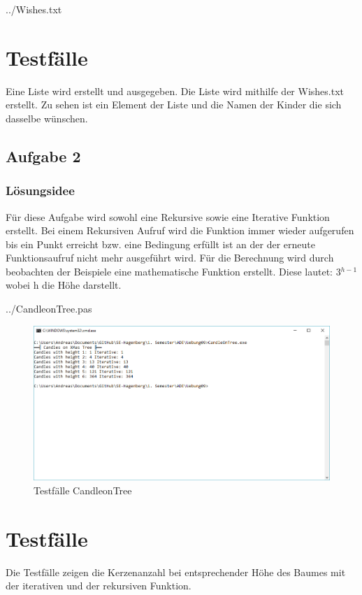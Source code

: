  {../Wishes.txt}

\section*{Testfälle}
Eine Liste wird erstellt und ausgegeben. Die Liste wird mithilfe der Wishes.txt erstellt.
Zu sehen ist ein Element der Liste und die Namen der Kinder die sich dasselbe wünschen.
\newpage
\subsection*{Aufgabe 2}
\subsubsection*{Lösungsidee}
Für diese Aufgabe wird sowohl eine Rekursive sowie eine Iterative Funktion erstellt. Bei einem Rekursiven Aufruf wird die Funktion immer wieder aufgerufen bis ein Punkt erreicht bzw. eine Bedingung erfüllt ist an der der erneute Funktionsaufruf nicht mehr ausgeführt wird. Für die Berechnung wird durch beobachten der Beispiele eine mathematische Funktion erstellt. Diese lautet: 3$^{h-1}$ wobei h die Höhe darstellt.
\newline

 {../CandleonTree.pas}
\begin{figure}[H]
	\centering
	\includegraphics[scale=0.65]{./pictures/CandlesOnTree.png}
	\caption{Testfälle CandleonTree}
	\label{fig: CandleonTree}
\end{figure}

\section*{Testfälle}
Die Testfälle zeigen die Kerzenanzahl bei entsprechender Höhe des Baumes mit der iterativen und der rekursiven Funktion.
\newpage

